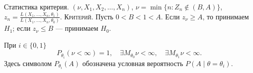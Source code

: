 

Статистика критерия. $(\nu, X_1, X_2, \dots, X_n)$,
 $\nu = \min \{ n : Z_n \notin (B, A) \}$,
$z_n = \frac{L(X_1, \dots, X_n, \theta_1)}{L(X_1, \dots, X_n, \theta_0)}$.
\textsc{Критерий}. Пусть $0<B<1<A$.
Если $z_\nu \geqslant A$, то принимаем $H_1$; если $z_\nu \leqslant B$ --- принимаем $H_0$.

\begin{theorem}
  При $i \in \{ 0, 1 \}$
  \[
    P_{\theta_i}(\nu < \infty) = 1,\quad \exists M_{\theta_0} \nu < \infty,
    \quad \exists M_{\theta_1} \nu < \infty.
  \]
  Здесь символом $P_{\theta_i} (A)$ обозначена условная вероятность $P(A \mid
  \theta = \theta_i)$.
\end{theorem}

